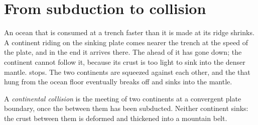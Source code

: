 \section{From subduction to collision}

An ocean that is consumed at a trench faster than it is made at its ridge
shrinks. A continent riding on the sinking plate comes nearer the trench at
the speed of the plate, and in the end it arrives there. The  ahead of it has gone down; the continent cannot follow it,
because its crust is too light to sink into the denser mantle. 
stops. The two continents are squeezed against each other, and the 
that hung from the ocean floor eventually breaks off and sinks into the
mantle.

\begin{definition}\label{def:g12:mountain-building:collision}
A \emph{continental collision} is the meeting of
two continents at a convergent plate boundary, once the 
between them has been subducted. Neither continent sinks: the crust between
them is deformed and thickened into a mountain belt.
\end{definition}

